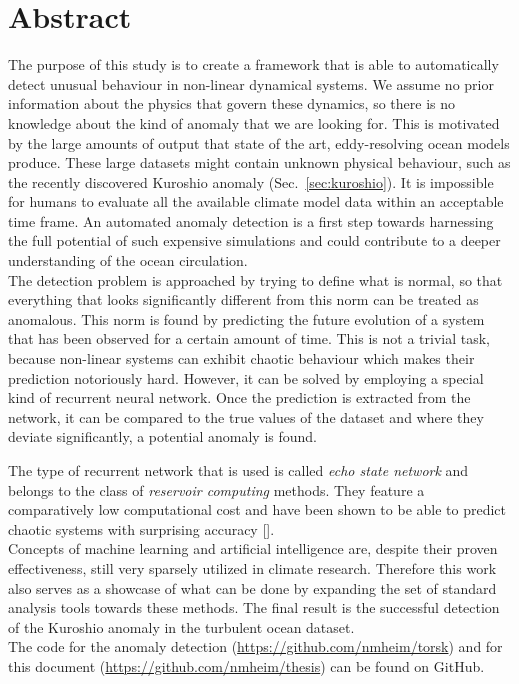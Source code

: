 \section*{Abstract}%
\label{sec:abstract}

The purpose of this study is to create a framework that is able to
automatically detect unusual behaviour in non-linear dynamical systems.  We
assume no prior information about the physics that govern these dynamics, so
there is no knowledge about the kind of anomaly that we are looking for.  This
is motivated by the large amounts of output that state of the art,
eddy-resolving ocean models produce.  These large datasets might contain
unknown physical behaviour, such as the recently discovered Kuroshio anomaly
(Sec.~\ref{sec:kuroshio}).  It is impossible for humans to evaluate all the
available climate model data within an acceptable time frame. An automated
anomaly detection is a first step towards harnessing the full potential of such
expensive simulations and could contribute to a deeper understanding of the
ocean circulation.\\

The detection problem is approached by trying to define what is normal, so that
everything that looks significantly different from this norm can be treated as
anomalous. This norm is found by predicting the future evolution of a system
that has been observed for a certain amount of time.  This is not a trivial
task, because non-linear systems can exhibit chaotic behaviour which makes
their prediction notoriously hard. However, it can be solved by employing a
special kind of recurrent neural network. Once the prediction is extracted from
the network, it can be compared to the true values of the dataset and where
they deviate significantly, a potential anomaly is found.

The type of recurrent network that is used is called \emph{echo state network}
and belongs to the class of \emph{reservoir computing} methods.  They feature a
comparatively low computational cost and have been shown to be able to predict
chaotic systems with surprising accuracy [\cite{pathak2018model}].\\

Concepts of machine learning and artificial intelligence are, despite their
proven effectiveness, still very sparsely utilized in climate research.
Therefore this work also serves as a showcase of what can be done by expanding
the set of standard analysis tools towards these methods.
The final result is the successful detection of the Kuroshio anomaly in the
turbulent ocean dataset.\\

\vfill
The code for the anomaly detection (\url{https://github.com/nmheim/torsk}) and
for this document (\url{https://github.com/nmheim/thesis}) can be found on
GitHub.
